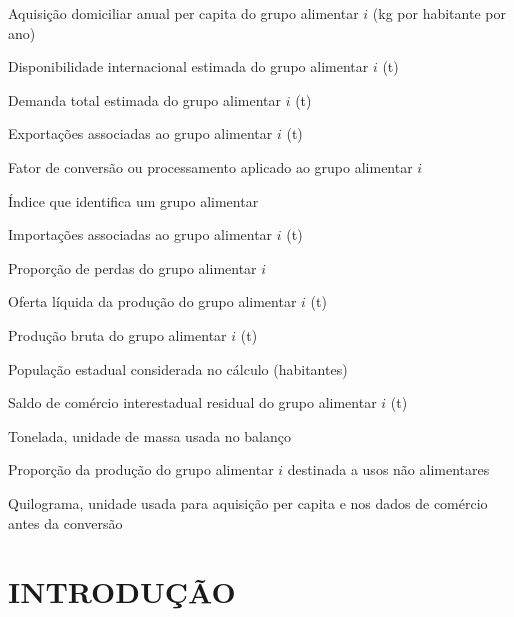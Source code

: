 \documentclass[
	12pt,				%
	openright,			%
	oneside,			%
	a4paper,			%
	chapter=TITLE,		%
	section=TITLE,		%
	english,			%
	french,				%
	spanish,			%
	brazil,				%
 ]{abntex2}
\begin{document}
\begin{simbolos}
\item[$c_i$] Aquisição domiciliar anual per capita do grupo alimentar $i$ (kg por habitante por ano)
\item[$\mathrm{DIE}_{i}$] Disponibilidade internacional estimada do grupo alimentar $i$ (t)
\item[$\mathrm{DT}_{i}$] Demanda total estimada do grupo alimentar $i$ (t)
\item[$\mathrm{EXP}_{i}$] Exportações associadas ao grupo alimentar $i$ (t)
\item[$f_{\mathrm{proc},i}$] Fator de conversão ou processamento aplicado ao grupo alimentar $i$
\item[$i$] Índice que identifica um grupo alimentar
\item[$\mathrm{IMP}_{i}$] Importações associadas ao grupo alimentar $i$ (t)
\item[$\ell_i$] Proporção de perdas do grupo alimentar $i$
\item[$\mathrm{OLP}_{i}$] Oferta líquida da produção do grupo alimentar $i$ (t)
\item[$\mathrm{PB}_{i}$] Produção bruta do grupo alimentar $i$ (t)
\item[$\mathrm{POP}$] População estadual considerada no cálculo (habitantes)
\item[$\mathrm{SCI}_{i}$] Saldo de comércio interestadual residual do grupo alimentar $i$ (t)
\item[$\mathrm{t}$] Tonelada, unidade de massa usada no balanço
\item[$u_{\mathrm{na},i}$] Proporção da produção do grupo alimentar $i$ destinada a usos não alimentares
\item[$\mathrm{kg}$] Quilograma, unidade usada para aquisição per capita e nos dados de comércio antes da conversão
\end{simbolos}

\tableofcontents*
\cleardoublepage


\textual

\chapter*[INTRODUÇÃO]{INTRODUÇÃO}
\end{document}

